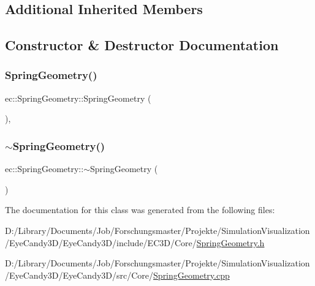 \subsection*{Additional Inherited Members}


\subsection{Constructor \& Destructor Documentation}
\mbox{\label{classec_1_1_spring_geometry_afc2aa4b3e49cc72083f9b3bc1b1d22be}} 
\subsubsection{\texorpdfstring{Spring\+Geometry()}{SpringGeometry()}}
{\footnotesize\ttfamily ec\+::\+Spring\+Geometry\+::\+Spring\+Geometry (\begin{DoxyParamCaption}{ }\end{DoxyParamCaption})\hspace{0.3cm}{\ttfamily [explicit]}, {\ttfamily [default]}}

\mbox{\label{classec_1_1_spring_geometry_aaf7c2395d3d548c549eb76a10c85a60e}} 
\subsubsection{\texorpdfstring{$\sim$\+Spring\+Geometry()}{~SpringGeometry()}}
{\footnotesize\ttfamily ec\+::\+Spring\+Geometry\+::$\sim$\+Spring\+Geometry (\begin{DoxyParamCaption}{ }\end{DoxyParamCaption})\hspace{0.3cm}{\ttfamily [default]}}



The documentation for this class was generated from the following files\+:\begin{DoxyCompactItemize}
\item 
D\+:/\+Library/\+Documents/\+Job/\+Forschungsmaster/\+Projekte/\+Simulation\+Visualization/\+Eye\+Candy3\+D/\+Eye\+Candy3\+D/include/\+E\+C3\+D/\+Core/\mbox{\hyperlink{_spring_geometry_8h}{Spring\+Geometry.\+h}}\item 
D\+:/\+Library/\+Documents/\+Job/\+Forschungsmaster/\+Projekte/\+Simulation\+Visualization/\+Eye\+Candy3\+D/\+Eye\+Candy3\+D/src/\+Core/\mbox{\hyperlink{_spring_geometry_8cpp}{Spring\+Geometry.\+cpp}}\end{DoxyCompactItemize}
